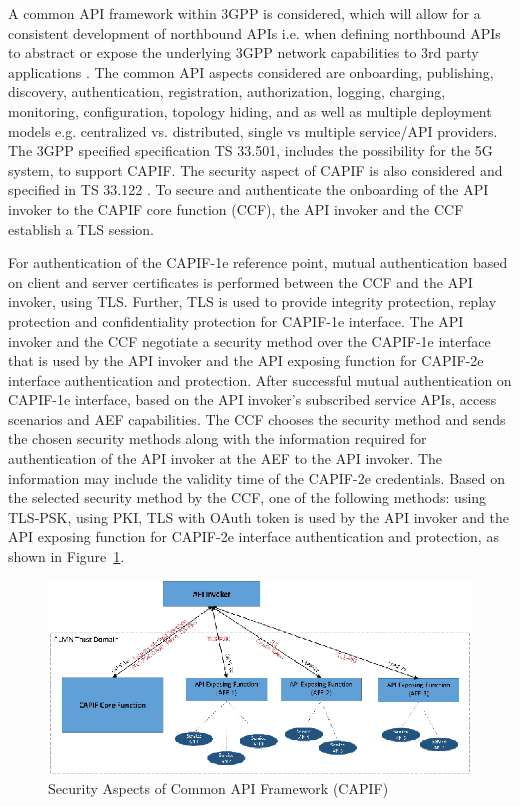 \begin{multicols}{2}
A common API framework within 3GPP is considered, which will allow for a consistent development of northbound APIs i.e. when defining northbound APIs to abstract or expose the underlying 3GPP network capabilities to 3rd party applications \cite{art4-key10}. The common API  aspects considered are onboarding, publishing, discovery, authentication, registration, authorization, logging, charging, monitoring, configuration, topology hiding, and as well as multiple deployment models e.g. centralized vs. distributed, single vs multiple service/API providers. The 3GPP specified specification TS 33.501\cite{art4-key03}, includes the possibility for the 5G system, to support CAPIF. The security aspect of CAPIF is also considered and specified in TS 33.122 \cite{art4-key04}. To secure and authenticate the onboarding of the API invoker to the CAPIF core function (CCF), the API invoker and the CCF establish a TLS session. 

For authentication of the CAPIF-1e reference point, mutual authentication based on client and server certificates is performed between the CCF and the API invoker, using TLS. Further, TLS is used to provide integrity protection, replay protection and confidentiality protection for CAPIF-1e interface. The API invoker and the CCF negotiate a security method over the CAPIF-1e interface that is used by the API invoker and the API exposing function for CAPIF-2e interface authentication and protection. After successful mutual authentication on CAPIF-1e interface, based on the API invoker's subscribed service APIs, access scenarios and AEF capabilities. The CCF chooses the security method and sends the chosen security methods along with the information required for authentication of the API invoker at the AEF to the API invoker. The information may include the validity time of the CAPIF-2e credentials. Based on the selected security method by the CCF, one of the following methods: using TLS-PSK, using PKI, TLS with OAuth token is used by the API invoker and the API exposing function for CAPIF-2e interface authentication and protection, as shown in Figure~\ref{chap4-fig09}.
\begin{figure}[H]
\centering
\includegraphics[scale=1.3]{src/Figures/chap4/chap4-fig09.jpg}
\caption{Security Aspects of Common API Framework (CAPIF)}\label{chap4-fig09}
\end{figure}


\end{multicols}
